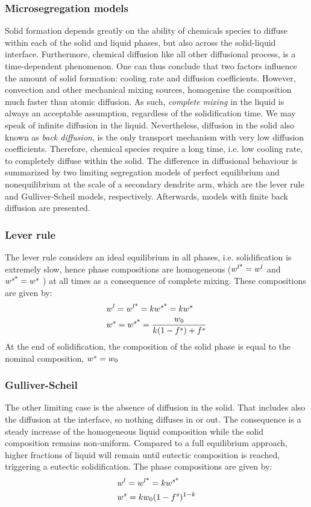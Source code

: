 \subsubsection{Microsegregation models}
Solid formation depends greatly on the ability of chemicals species to diffuse within each of the solid and liquid phases, but also across the
solid-liquid interface. Furthermore, chemical diffusion like all other diffusional process, is a time-dependent phenomenon. One can thus conclude that two factors
influence the amount of solid formation: cooling rate and diffusion coefficients. However, convection and other mechanical mixing sources, 
homogenise the composition much faster than atomic diffusion. As such, \emph{complete mixing} in the liquid is always an acceptable assumption, regardless of the 
solidification time. We may speak of infinite diffusion in the liquid. Nevertheless, diffusion in the solid also known as \emph{back diffusion}, is the only transport mechanism with very low diffusion coefficients. Therefore, chemical species require a long time, i.e. low cooling rate, to completely diffuse within the solid.
The difference in diffusional behaviour is summarized by two limiting segregation models of perfect equilibrium and nonequilibrium at the scale
of a secondary dendrite arm, which are the lever rule and Gulliver-Scheil models, respectively. Afterwards, models with finite back diffusion are presented. 
\subsubsection*{Lever rule}
The lever rule considers an ideal equilibrium in all phases, i.e. solidification is extremely slow, hence phase compositions are 
homogeneous ($ {w}^{l \text{*}}  = {w}^l$ and $ {w}^{s \text{*}}  = {w}^s$ ) at all times as a consequence of complete mixing. 
These compositions are given by:
\begin{align}
\label{eq:leverrule}
& {w}^l= {w}^{l \text{*}}  = k {w}^{s \text{*}}  = k {w}^s \\
& {w}^s= {w}^{s \text{*}}  = \frac{{w}_0}{k(1-{f^s}) + {f^s}}
\end{align}
At the end of solidification, the composition of the solid phase is equal to the nominal composition, ${w}^s = {w}_0$
\subsubsection*{Gulliver-Scheil}
The other limiting case is the absence of diffusion in the solid. That includes also the diffusion at the interface, so nothing diffuses in or out. The consequence is a steady increase of the homogeneous liquid composition while the solid composition remains non-uniform.
Compared to a full equilibrium approach, higher fractions of liquid
will remain until eutectic composition is reached, triggering a eutectic solidification. The phase compositions are given by:
\begin{align}
\label{eq:scheil}
& {w}^l= {w}^{l \text{*}}  = k {w}^{s \text{*}}  \\
& {w}^s= k {w}_0 (1-{f^s})^{1-k}
\end{align}
